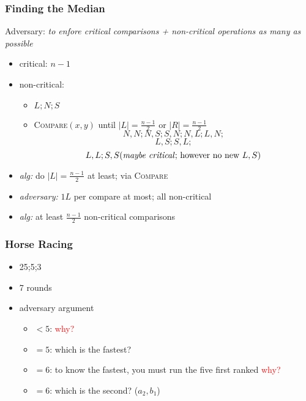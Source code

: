 \documentclass{beamer}
\begin{document}
\begin{frame}
  \frametitle{Finding the Median}
  
  \begin{example}
    Adversary: \emph{to enfore critical comparisons + non-critical operations as
    many as possible}
    \begin{itemize}
      \item critical: $n-1$
      \item non-critical:
        \begin{itemize}
          \item $L;N;S$
          \item \textsc{Compare}$(x,y)$ until $|L| = \frac{n-1}{2}$ or $|R| =
          \frac{n-1}{2}$ 
          $$N,N;N,S; S,N;N,L; L,N;$$
          $$L,S; S,L;$$ 
          $$L,L; S,S \textrm{(\emph{maybe critical}; however no new } L, S)$$
        \end{itemize}
      \item \emph{alg:} do $|L| = \frac{n-1}{2}$ at least; via \textsc{Compare}
      \item \emph{adversary:} $1 L$ per compare at most; all non-critical
      \item \emph{alg:} at least $\frac{n-1}{2}$ non-critical comparisons
    \end{itemize}
  \end{example}
\end{frame}

\begin{frame}
  \frametitle{Horse Racing}
  
  \begin{example}
    \begin{itemize}
      \item 25;5;3
      \item 7 rounds
      \item adversary argument
        \begin{itemize}
          \item $< 5$: \textcolor{red}{why?}
          \item $= 5$: which is the fastest?
          \item $= 6$: to know the fastest, you must run the five first ranked
          \textcolor{red}{why?}
          \item $= 6$: which is the second? ($a_2, b_1$)
        \end{itemize}
    \end{itemize}
  \end{example}
\end{frame}
\end{document}
